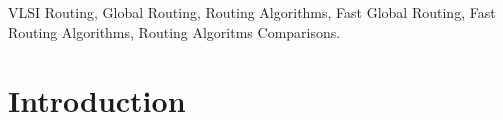 \documentclass[conference]{IEEEtran}
\begin{document}

\begin{IEEEkeywords}
VLSI Routing, Global Routing, Routing Algorithms, Fast Global Routing, Fast Routing Algorithms, Routing Algoritms Comparisons.
\end{IEEEkeywords} 


\section{Introduction}
\end{document}
